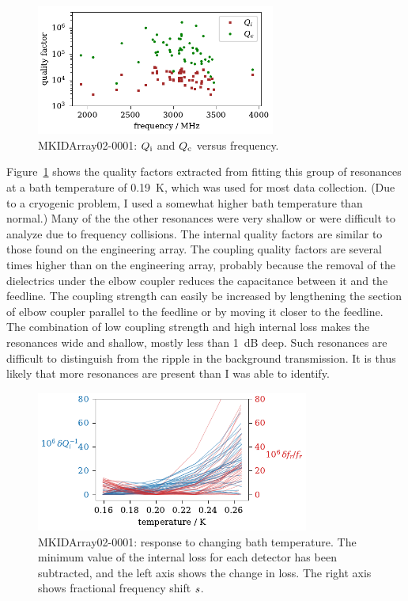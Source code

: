 \begin{figure}[htb]
\centering
\includegraphics[width=0.7\textwidth]{multichroic/mkidarray02_all_scans_Qi_and_Qc_vs_frequency.pdf}
\caption[MKIDArray02-0001: $\qf_\internal$ and $\qf_\coupling$ versus frequency.]
{
MKIDArray02-0001: $\qf_\internal$ and $\qf_\coupling$ versus frequency.
}
\label{fig:mkidarray02_all_scans_Qi_and_Qc_vs_frequency}
\end{figure}

Figure~\ref{fig:mkidarray02_all_scans_Qi_and_Qc_vs_frequency} shows the quality factors extracted from fitting this group of resonances at a bath temperature of \SI{0.19}{K}, which was used for most data collection.
(Due to a cryogenic problem, I used a somewhat higher bath temperature than normal.)
Many of the the other resonances were very shallow or were difficult to analyze due to frequency collisions.
The internal quality factors are similar to those found on the engineering array.
The coupling quality factors are several times higher than on the engineering array, probably because the removal of the dielectrics under the elbow coupler reduces the capacitance between it and the feedline.
The coupling strength can easily be increased by lengthening the section of elbow coupler parallel to the feedline or by moving it closer to the feedline.
The combination of low coupling strength and high internal loss makes the resonances wide and shallow, mostly less than \SI{1}{dB} deep.
Such resonances are difficult to distinguish from the ripple in the background transmission.
It is thus likely that more resonances are present than I was able to identify.

\begin{figure}[htb]
\centering
\includegraphics[width=0.8\textwidth]{multichroic/mkidarray02_all_bath_temperature_response.pdf}
\caption[MKIDArray02-0001: response to changing bath temperature.]
{
MKIDArray02-0001: response to changing bath temperature.
The minimum value of the internal loss for each detector has been subtracted, and the left axis shows the change in loss.
The right axis shows fractional frequency shift $s$.
}
\label{fig:mkidarray02_all_bath_temperature_response}
\end{figure}

